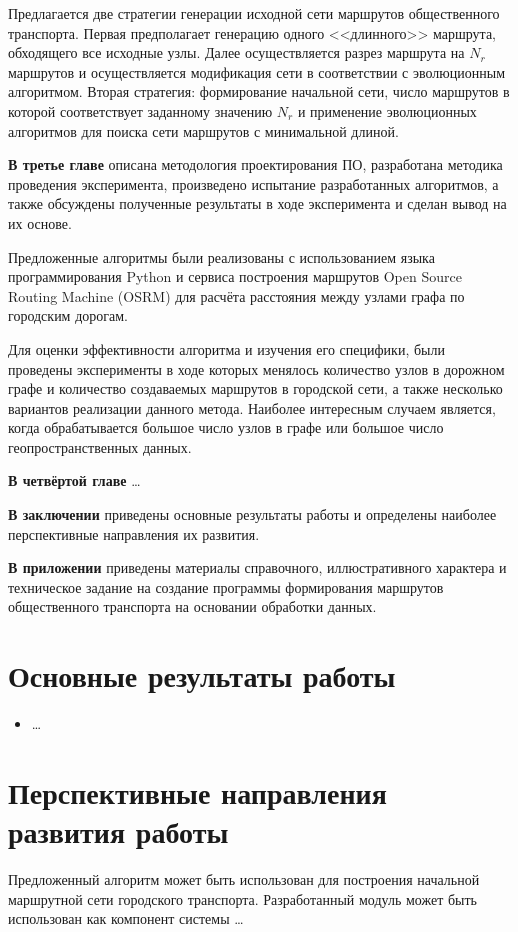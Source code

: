 Предлагается две стратегии генерации исходной сети маршрутов общественного транспорта. Первая предполагает 
генерацию одного <<длинного>> маршрута, обходящего все исходные узлы. Далее осуществляется разрез маршрута 
на \( N_r \) маршрутов и осуществляется модификация сети в соответствии с эволюционным алгоритмом. Вторая 
стратегия: формирование начальной сети, число маршрутов в которой соответствует заданному значению \( N_r \) 
и применение эволюционных алгоритмов для поиска сети маршрутов с минимальной длиной.

\textbf{В третье главе} описана методология проектирования ПО, разработана методика проведения эксперимента, 
произведено испытание разработанных алгоритмов, а также обсуждены полученные результаты в ходе эксперимента 
и сделан вывод на их основе.

Предложенные алгоритмы были реализованы с использованием языка программирования Python и сервиса построения 
маршрутов Open Source Routing Machine (OSRM) для расчёта расстояния между узлами графа по городским дорогам.

Для оценки эффективности алгоритма и изучения его специфики, были проведены эксперименты в ходе которых 
менялось количество узлов в дорожном графе и количество создаваемых маршрутов в городской сети, а также 
несколько вариантов реализации данного метода. Наиболее интересным случаем является, когда обрабатывается 
большое число узлов в графе или большое число геопространственных данных.

\textbf{В четвёртой главе} \ldots

\textbf{В заключении} приведены основные результаты работы и определены наиболее перспективные направления 
их развития.

\textbf{В приложении} приведены материалы справочного, иллюстративного характера и техническое задание на 
создание программы формирования маршрутов общественного транспорта на основании обработки данных.

\section{Основные результаты работы}
\begin{itemize}
    \item \ldots
\end{itemize}

\section{Перспективные направления развития работы}
Предложенный алгоритм может быть использован для построения начальной маршрутной сети городского транспорта.
Разработанный модуль может быть использован как компонент системы \ldots

